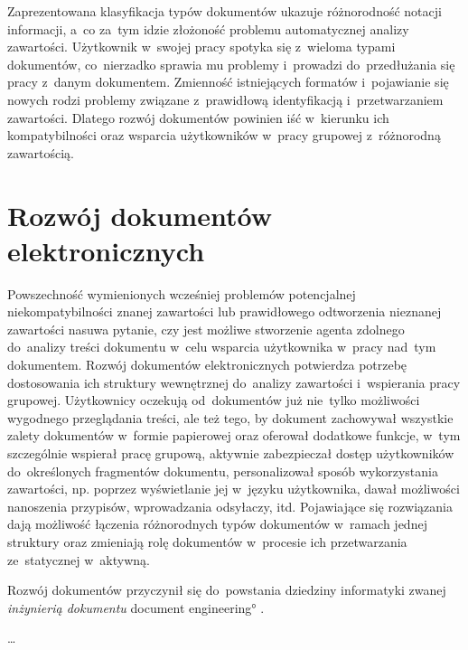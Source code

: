 Zaprezentowana klasyfikacja typów dokumentów ukazuje różnorodność notacji informacji, a~co za~tym idzie złożoność problemu automatycznej analizy zawartości. Użytkownik w~swojej pracy spotyka się z~wieloma typami dokumentów, co~nierzadko sprawia mu problemy i~prowadzi do~przedłużania się pracy z~danym dokumentem. Zmienność istniejących formatów i~pojawianie się nowych rodzi problemy związane z~prawidłową identyfikacją i~przetwarzaniem zawartości. Dlatego rozwój dokumentów powinien iść w~kierunku ich kompatybilności oraz wsparcia użytkowników w~pracy grupowej z~różnorodną zawartością.

\section{Rozwój dokumentów elektronicznych}
\label{sec:RozwójDokumentówElektronicznych}

Powszechność wymienionych wcześniej problemów potencjalnej niekompatybilności znanej zawartości lub prawidłowego odtworzenia nieznanej zawartości nasuwa pytanie, czy jest możliwe stworzenie agenta zdolnego do~analizy treści dokumentu w~celu wsparcia użytkownika w~pracy nad~tym dokumentem. Rozwój dokumentów elektronicznych potwierdza potrzebę dostosowania ich struktury wewnętrznej do~analizy zawartości i~wspierania pracy grupowej. 
Użytkownicy oczekują od~dokumentów już nie~tylko możliwości wygodnego przeglądania treści, ale też tego, by dokument zachowywał wszystkie zalety dokumentów w~formie papierowej oraz oferował dodatkowe funkcje, w~tym szczególnie wspierał pracę grupową, aktywnie zabezpieczał dostęp użytkowników do~określonych fragmentów dokumentu, personalizował sposób wykorzystania zawartości, np. poprzez wyświetlanie jej w~języku użytkownika, dawał możliwości nanoszenia przypisów, wprowadzania odsyłaczy, itd. Pojawiające się rozwiązania dają możliwość łączenia różnorodnych typów dokumentów w~ramach jednej struktury oraz zmieniają rolę dokumentów w~procesie ich przetwarzania ze~statycznej w~aktywną. 

Rozwój dokumentów przyczynił się do~powstania dziedziny informatyki zwanej \emph{inżynierią dokumentu} \ang{document engineering} \cite{doc_centric2, doc_centric}. 

\dots

